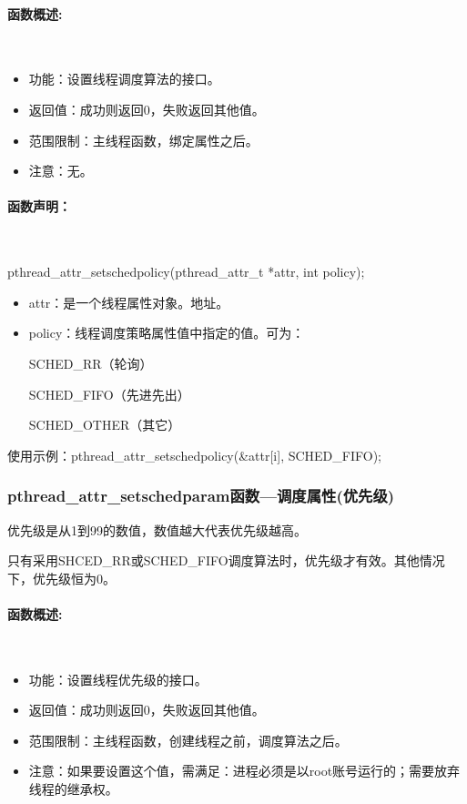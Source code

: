 \documentclass[UTF8]{article}%
\begin{document}
\paragraph{函数概述:}~{}

\begin{itemize}
    \item 功能：设置线程调度算法的接口。
    \item 返回值：成功则返回0，失败返回其他值。
    \item 范围限制：主线程函数，绑定属性之后。
    \item 注意：无。
\end{itemize}

\paragraph{函数声明：}~{}

pthread\_attr\_setschedpolicy(pthread\_attr\_t *attr, int policy);

\begin{itemize}
    \item attr：是一个线程属性对象。地址。
    \item policy：线程调度策略属性值中指定的值。可为：
    
    SCHED\_RR（轮询）
    
    SCHED\_FIFO（先进先出）
    
    SCHED\_OTHER（其它）

\end{itemize}

使用示例：pthread\_attr\_setschedpolicy(\&attr[i], SCHED\_FIFO);  

\subsubsection{pthread\_attr\_setschedparam函数---调度属性(优先级)}

优先级是从1到99的数值，数值越大代表优先级越高。

只有采用SHCED\_RR或SCHED\_FIFO调度算法时，优先级才有效。其他情况下，优先级恒为0。

\paragraph{函数概述:}~{}

\begin{itemize}
    \item 功能：设置线程优先级的接口。
    \item 返回值：成功则返回0，失败返回其他值。
    \item 范围限制：主线程函数，创建线程之前，调度算法之后。
    \item 注意：如果要设置这个值，需满足：进程必须是以root账号运行的；需要放弃线程的继承权。
\end{itemize}
\end{document}
